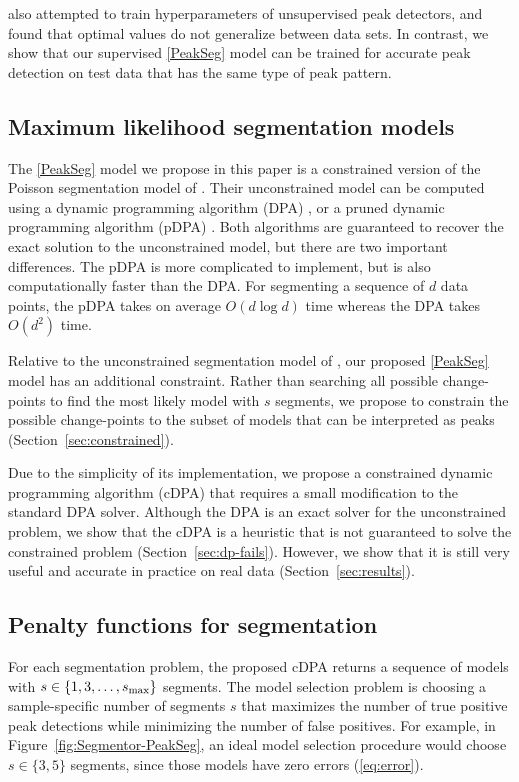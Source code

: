 \documentclass{article}
\begin{document}
\citet{DFilter} also attempted to train hyperparameters of
unsupervised peak detectors, and \citet{picking2012} found that
optimal values do not generalize between data sets. In contrast, we
show that our supervised \ref{PeakSeg} model can be trained for
accurate peak detection on test data that has the same type of peak
pattern.

\subsection{Maximum likelihood segmentation models}

The \ref{PeakSeg} model we propose in this paper is a constrained
version of the Poisson segmentation model of \citet{Segmentor}.
Their unconstrained model can be computed using a dynamic programming
algorithm (DPA) \citep{bellman}, or a pruned dynamic programming
algorithm (pDPA) \citep{pruned-dp}. Both algorithms are guaranteed to
recover the exact solution to the unconstrained model, but there are
two important differences. The pDPA is more complicated to implement,
but is also computationally faster than the DPA. For segmenting a
sequence of $d$ data points, the pDPA takes on average $O(d\log d)$
time whereas the DPA takes $O(d^2)$ time. 

Relative to the unconstrained segmentation model of \citet{Segmentor},
our proposed \ref{PeakSeg} model has an additional constraint. Rather
than searching all possible change-points to find the most likely
model with $s$ segments, we propose to constrain the possible
change-points to the subset of models that can be interpreted as peaks
(Section~\ref{sec:constrained}).

Due to the simplicity of its implementation, we propose a constrained
dynamic programming algorithm (cDPA) that requires a small
modification to the standard DPA solver. Although the DPA is an exact
solver for the unconstrained problem, we show that the cDPA is a
heuristic that is not guaranteed to solve the constrained
problem (Section~\ref{sec:dp-fails}). However, we show that it is
still very useful and accurate in practice on real data
(Section~\ref{sec:results}).

\subsection{Penalty functions for segmentation}

For each segmentation problem, the proposed cDPA returns a sequence of
models with $s\in\{1, 3, \dots, s_{\text{\text{max}}}\}$ segments. The
model selection problem is choosing a sample-specific number of
segments $s$ that maximizes the number of true positive peak
detections while minimizing the number of false positives. For
example, in Figure~\ref{fig:Segmentor-PeakSeg}, an ideal model
selection procedure would choose $s\in\{3, 5\}$ segments, since those
models have zero errors (\ref{eq:error}).
\end{document}
